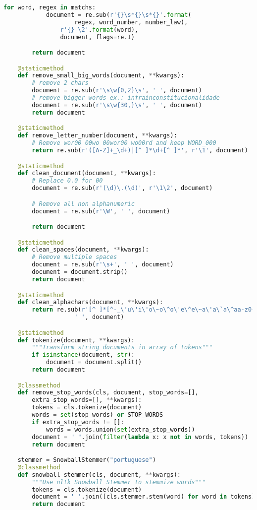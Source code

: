 \begin{lstlisting}[language=Python,extendedchars=true]
        for word, regex in matchs:
            document = re.sub(r'{}\s*{}\s*{}'.format(
                    regex, word_number, number_law),
                r'{}_\2'.format(word),
                document, flags=re.I)

        return document

    @staticmethod
    def remove_small_big_words(document, **kwargs):
        # remove 2 chars
        document = re.sub(r'\s\w{0,2}\s', ' ', document)
        # remove bigger words ex.: infrainconstitucionalidade
        document = re.sub(r'\s\w{30,}\s', ' ', document)
        return document

    @staticmethod
    def remove_letter_number(document, **kwargs):
        # Remove wor00 00wo 00wor00 wo00rd and keep WORD_000
        return re.sub(r'([A-Z]+_\d+)|[^ ]*\d+[^ ]*', r'\1', document)

    @staticmethod
    def clean_document(document, **kwargs):
        # Replace 0.0 for 00
        document = re.sub(r'(\d)\.(\d)', r'\1\2', document)

        # Remove all non alphanumeric
        document = re.sub(r'\W', ' ', document)

        return document

    @staticmethod
    def clean_spaces(document, **kwargs):
        # Remove multiple spaces
        document = re.sub(r'\s+', ' ', document)
        document = document.strip()
        return document

    @staticmethod
    def clean_alphachars(document, **kwargs):
        return re.sub(r'[^ ]*[^-_\'u\'i\'o\~o\^o\'e\^e\~a\'a\`a\^aa-z0-9\{\c c} ]+[^ ]*',
                    ' ', document)

    @staticmethod
    def tokenize(document, **kwargs):
        """Transform string documents in array of tokens"""
        if isinstance(document, str):
            document = document.split()
        return document

    @classmethod
    def remove_stop_words(cls, document, stop_words=[],
        extra_stop_words=[], **kwargs):
        tokens = cls.tokenize(document)
        words = set(stop_words) or STOP_WORDS
        if extra_stop_words != []:
            words = words.union(set(extra_stop_words))
        document = " ".join(filter(lambda x: x not in words, tokens))
        return document

    stemmer = SnowballStemmer("portuguese")
    @classmethod
    def snowball_stemmer(cls, document, **kwargs):
        """Use nltk Snowball Stemmer to stemmize words"""
        tokens = cls.tokenize(document)
        document = ' '.join([cls.stemmer.stem(word) for word in tokens])
        return document
\end{lstlisting}
